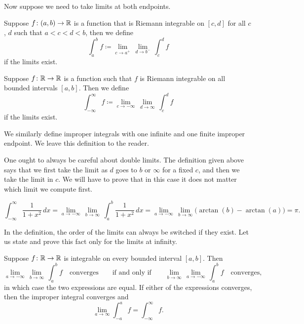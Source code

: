 Now suppose we need to take limits at both endpoints.

\begin{defn}
Suppose $f \colon (a,b) \to {\mathbb{R}}$ is a function
that is Riemann integrable on $[c,d]$ for all $c$, $d$
such that $a < c < d < b$, then we define
\begin{equation*}
\int_a^b f \coloneqq \lim_{c \to a^+} \, \lim_{d \to b^-} \, \int_{c}^{d} f
\end{equation*}
if the limits exist.

Suppose $f \colon {\mathbb{R}} \to {\mathbb{R}}$ is a function such that
$f$ is Riemann integrable on all bounded intervals $[a,b]$.  Then
we define
\begin{equation*}
\int_{-\infty}^\infty f \coloneqq \lim_{c \to -\infty} \, \lim_{d \to \infty} \, \int_c^d f
\end{equation*}
if the limits exist.

We similarly define improper integrals with one infinite and one finite
improper endpoint.  We leave this definition to the reader.
\end{defn}

One ought to always be careful about double limits.  The definition
given above says that we first take the limit as $d$ goes to $b$ or
$\infty$ for a fixed $c$, and then we take the limit in $c$.
We will have to prove that in this case it does not matter which limit
we compute first.

\begin{example}
\begin{equation*}
\int_{-\infty}^\infty \frac{1}{1+x^2} \, dx
=
\lim_{a \to -\infty} \, \lim_{b \to \infty} \,
\int_{a}^b \frac{1}{1+x^2} \, dx
=
\lim_{a \to -\infty} \, \lim_{b \to \infty}
\bigl( \arctan(b) - \arctan(a) \bigr)
=
\pi .
\end{equation*}
\end{example}

In the definition, the order of the limits can always be switched if they
exist.  Let us state and prove this fact only for the limits at infinity.

\begin{prop}
Suppose $f \colon {\mathbb{R}} \to {\mathbb{R}}$ is integrable on every bounded interval
$[a,b]$.
Then 
\begin{equation*}
\lim_{a \to -\infty} \, \lim_{b \to \infty} \, \int_a^b f
\quad \text{converges} \qquad \text{if and only if} \qquad
\lim_{b \to \infty}
\,
\lim_{a \to -\infty}
\,
\int_a^b f
\quad
\text{converges,}
\end{equation*}
in which case the two
expressions are equal.  If either of the
expressions converges, then the improper integral converges and
\begin{equation*}
\lim_{a\to\infty}
\int_{-a}^a f
=
\int_{-\infty}^\infty f .
\end{equation*}
\end{prop}

